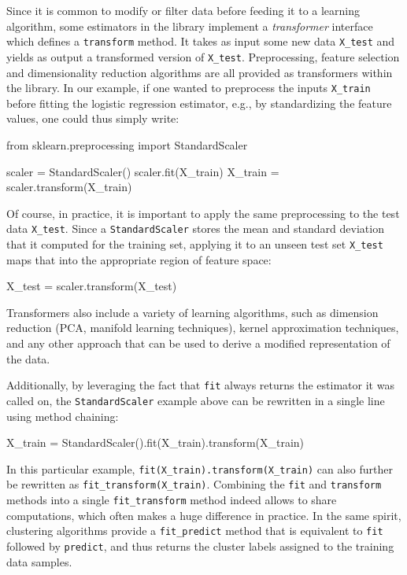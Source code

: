 \documentclass{llncs}
\begin{document}
Since it is common to modify or filter data before feeding it to a learning
algorithm, some estimators in the library implement a \textit{transformer}
interface which defines a \texttt{transform} method. It takes as input some new
data \texttt{X\_test} and yields as output a transformed version of
\texttt{X\_test}. Preprocessing, feature selection and dimensionality reduction
algorithms are all provided as transformers within the library.  In our example,
if one wanted to preprocess the inputs \texttt{X\_train} before fitting the
logistic regression estimator, e.g., by standardizing the feature values, one
could thus simply write:
\begin{pythoncode}
from sklearn.preprocessing import StandardScaler

scaler = StandardScaler()
scaler.fit(X_train)
X_train = scaler.transform(X_train)
\end{pythoncode}
Of course, in practice, it is important to apply the same preprocessing to the
test data \texttt{X\_test}.
Since a \texttt{StandardScaler} stores the mean and standard deviation
that it computed for the training set,
applying it to an unseen test set \texttt{X\_test}
maps that into the appropriate region of feature space:
\begin{pythoncode}
X_test = scaler.transform(X_test)
\end{pythoncode}
Transformers also include a variety of learning algorithms, such as
dimension reduction (PCA, manifold learning techniques), kernel
approximation techniques, and any other approach that can be used to
derive a modified representation of the data.

Additionally, by leveraging the fact that \texttt{fit} always returns the
estimator it was called on, the \texttt{StandardScaler} example above can be
rewritten in a single line using method chaining:
\begin{pythoncode}
X_train = StandardScaler().fit(X_train).transform(X_train)
\end{pythoncode}
In this particular example, \texttt{fit(X\_train).transform(X\_train)} can also further
be rewritten as \texttt{fit\_transform(X\_train)}.  Combining the \texttt{fit}
and \texttt{transform} methods into a single \texttt{fit\_transform} method
indeed allows to share computations, which often makes a huge difference in practice.
In the same spirit, clustering algorithms provide a
\texttt{fit\_predict} method
that is equivalent to \texttt{fit} followed by \texttt{predict},
and thus returns the cluster labels assigned to the training data samples.
\end{document}

